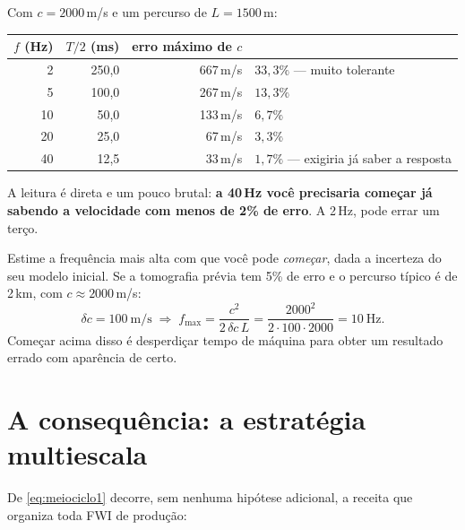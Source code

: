 \documentclass[11pt,a4paper,oneside]{report}
\begin{document}
Com $c = 2000$\,m/s e um percurso de $L = 1500$\,m:

\begin{center}
\begin{tabular}{@{}rrrl@{}}
\toprule
$f$ (Hz) & $T/2$ (ms) & erro m\'aximo de $c$ & \\
\midrule
2  & 250{,}0 & 667\,m/s & $33{,}3\%$ --- muito tolerante \\
5  & 100{,}0 & 267\,m/s & $13{,}3\%$ \\
10 & 50{,}0  & 133\,m/s & $6{,}7\%$ \\
20 & 25{,}0  & 67\,m/s  & $3{,}3\%$ \\
40 & 12{,}5  & 33\,m/s  & $1{,}7\%$ --- exigiria j\'a saber a resposta \\
\bottomrule
\end{tabular}
\end{center}

A leitura \'e direta e um pouco brutal: \textbf{a 40\,Hz voc\^e precisaria
come\c{c}ar j\'a sabendo a velocidade com menos de 2\% de erro}. A 2\,Hz,
pode errar um ter\c{c}o.

\begin{pratica}
Estime a frequ\^encia mais alta com que voc\^e pode \emph{come\c{c}ar}, dada
a incerteza do seu modelo inicial. Se a tomografia pr\'evia tem 5\% de erro e
o percurso t\'ipico \'e de 2\,km, com $c\approx 2000$\,m/s:
\[
\delta c = 100\ \text{m/s} \;\Longrightarrow\;
f_{\max} = \frac{c^2}{2\,\delta c\,L}
 = \frac{2000^2}{2\cdot 100\cdot 2000} = 10\ \text{Hz}.
\]
Come\c{c}ar acima disso \'e desperdi\c{c}ar tempo de m\'aquina para obter um
resultado errado com apar\^encia de certo.
\end{pratica}

\section{A consequ\^encia: a estrat\'egia multiescala}

De \eqref{eq:meiociclo1} decorre, sem nenhuma hip\'otese adicional, a receita
que organiza toda FWI de produ\c{c}\~ao:
\end{document}
